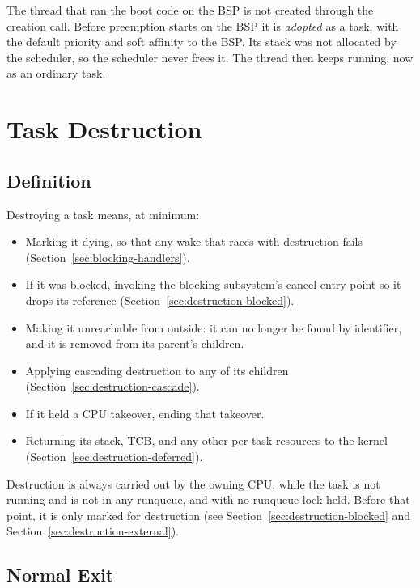 \documentclass[11pt]{article}
\begin{document}
The thread that ran the boot code on the BSP is not created through the creation call. Before preemption starts on the BSP it is \textit{adopted} as a task, with the default priority and soft affinity to the BSP. Its stack was not allocated by the scheduler, so the scheduler never frees it.
The thread then keeps running, now as an ordinary task.

\section{Task Destruction}
\label{sec:task-destruction}

\subsection{Definition}
\label{sec:destruction-definition}

Destroying a task means, at minimum:

\begin{itemize}
	\item Marking it dying, so that any wake that races with destruction fails (Section~\ref{sec:blocking-handlers}).
	\item If it was blocked, invoking the blocking subsystem's cancel entry point so it drops its reference (Section~\ref{sec:destruction-blocked}).
	\item Making it unreachable from outside: it can no longer be found by identifier, and it is removed from its parent's children.
	\item Applying cascading destruction to any of its children (Section~\ref{sec:destruction-cascade}).
	\item If it held a CPU takeover, ending that takeover.
	\item Returning its stack, TCB, and any other per-task resources to the kernel (Section~\ref{sec:destruction-deferred}).
\end{itemize}

Destruction is always carried out by the owning CPU, while the task is not running and is not in any runqueue, and with no runqueue lock held.
Before that point, it is only marked for destruction (see Section~\ref{sec:destruction-blocked} and Section~\ref{sec:destruction-external}).

\subsection{Normal Exit}
\label{sec:destruction-normal}
\end{document}

